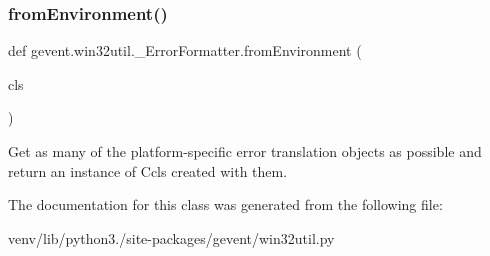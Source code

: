 \subsubsection{\texorpdfstring{from\+Environment()}{fromEnvironment()}}
{\footnotesize\ttfamily def gevent.\+win32util.\+\_\+\+Error\+Formatter.\+from\+Environment (\begin{DoxyParamCaption}\item[{}]{cls }\end{DoxyParamCaption})}

\begin{DoxyVerb}Get as many of the platform-specific error translation objects as
possible and return an instance of C{cls} created with them.
\end{DoxyVerb}
 

The documentation for this class was generated from the following file\+:\begin{DoxyCompactItemize}
\item 
venv/lib/python3./site-\/packages/gevent/win32util.\+py\end{DoxyCompactItemize}

